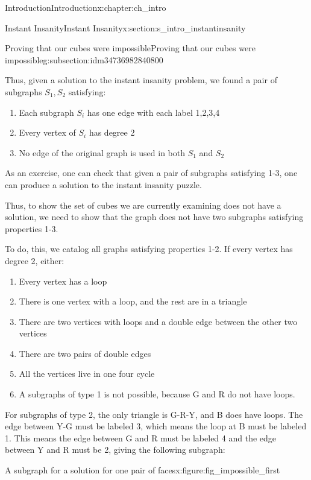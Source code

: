 \documentclass[oneside,10pt,]{book}
\numberwithin{equation}{section}
\begin{document}
\begin{chapterptx}{Introduction}{}{Introduction}{}{}{x:chapter:ch_intro}
\begin{sectionptx}{Instant Insanity}{}{Instant Insanity}{}{}{x:section:s_intro_instantinsanity}
\begin{subsectionptx}{Proving that our cubes were impossible}{}{Proving that our cubes were impossible}{}{}{g:subsection:idm34736982840800}
\par
Thus, given a solution to the instant insanity problem, we found a pair of subgraphs \(S_1, S_2\) satisfying:%
\begin{enumerate}
\item{}Each subgraph \(S_i\) has one edge with each label 1,2,3,4%
\item{}Every vertex of \(S_i\) has degree 2%
\item{}No edge of the original graph is used in both \(S_1\) and \(S_2\)%
\end{enumerate}
As an exercise, one can check that given a pair of subgraphs satisfying 1-3, one can produce a solution to the instant insanity puzzle.%
\par
Thus, to show the set of cubes we are currently examining does not have a solution, we need to show that the graph does not have two subgraphs satisfying properties 1-3.%
\par
To do, this, we catalog all graphs satisfying properties 1-2. If every vertex has degree 2, either:%
\begin{enumerate}
\item{}Every vertex has a loop%
\item{}There is one vertex with a loop, and the rest are in a triangle%
\item{}There are two vertices with loops and a double edge between the other two vertices%
\item{}There are two pairs of double edges%
\item{}All the vertices live in one four cycle%
\item{}A subgraphs of type 1 is not possible, because G and R do not have loops.%
\end{enumerate}
%
\par
For subgraphs of type 2, the only triangle is G-R-Y, and B does have loops. The edge between Y-G must be labeled 3, which means the loop at B must be labeled 1. This means the edge between G and R must be labeled 4 and the edge between Y and R must be 2, giving the following subgraph:%
\begin{figureptx}{A subgraph for a solution for one pair of faces}{x:figure:fig_impossible_first}{}%
\begin{image}{0.3}{0.4}{0.3}%

\end{image}
\end{figureptx}
\end{subsectionptx}
\end{sectionptx}
\end{chapterptx}
\end{document}

